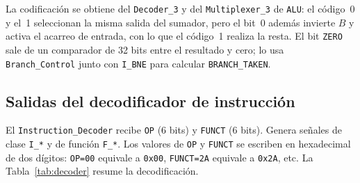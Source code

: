 \documentclass[11pt,a4paper]{article}
\begin{document}
\noindent La codificación se obtiene del \texttt{Decoder\_3} y del \texttt{Multiplexer\_3} de \texttt{ALU}: el código~0 y el~1 seleccionan la misma salida del sumador, pero el bit~0 además invierte $B$ y activa el acarreo de entrada, con lo que el código~1 realiza la resta. El bit \texttt{ZERO} sale de un comparador de 32 bits entre el resultado y cero; lo usa \texttt{Branch\_Control} junto con \texttt{I\_BNE} para calcular \texttt{BRANCH\_TAKEN}.

\subsection{Salidas del decodificador de instrucción}

El \texttt{Instruction\_Decoder} recibe \texttt{OP} (6 bits) y \texttt{FUNCT} (6 bits). Genera señales de clase \texttt{I\_*} y de función \texttt{F\_*}. Los valores de \texttt{OP} y \texttt{FUNCT} se escriben en hexadecimal de dos dígitos: \texttt{OP=00} equivale a \texttt{0x00}, \texttt{FUNCT=2A} equivale a \texttt{0x2A}, etc. La Tabla~\ref{tab:decoder} resume la decodificación.
\end{document}
